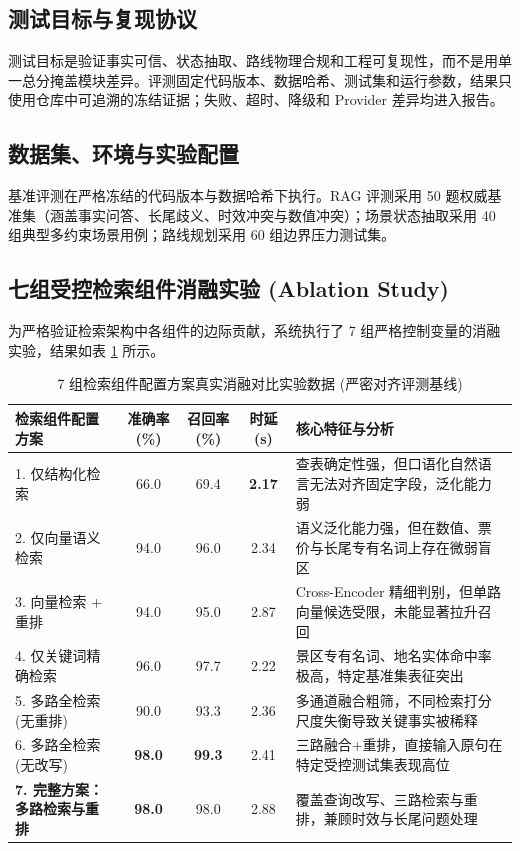 \documentclass[11pt,a4paper]{ctexart}
\begin{document}
\subsection{测试目标与复现协议}
测试目标是验证事实可信、状态抽取、路线物理合规和工程可复现性，而不是用单一总分掩盖模块差异。评测固定代码版本、数据哈希、测试集和运行参数，结果只使用仓库中可追溯的冻结证据；失败、超时、降级和 Provider 差异均进入报告。

\subsection{数据集、环境与实验配置}
基准评测在严格冻结的代码版本与数据哈希下执行。RAG 评测采用 50 题权威基准集（涵盖事实问答、长尾歧义、时效冲突与数值冲突）；场景状态抽取采用 40 组典型多约束场景用例；路线规划采用 60 组边界压力测试集。

\subsection{七组受控检索组件消融实验 (Ablation Study)}
为严格验证检索架构中各组件的边际贡献，系统执行了 7 组严格控制变量的消融实验，结果如表 \ref{tab:ablation} 所示。

\begin{table}[htbp]
\centering
\small
\caption{7 组检索组件配置方案真实消融对比实验数据 (严密对齐评测基线)}
\label{tab:ablation}
\begin{tabularx}{\textwidth}{p{4.5cm}cccX}
\toprule
\textbf{检索组件配置方案} & \textbf{准确率(\%)} & \textbf{召回率(\%)} & \textbf{时延(s)} & \textbf{核心特征与分析} \\
\midrule
1. 仅结构化检索 & 66.0 & 69.4 & \textbf{2.17} & 查表确定性强，但口语化自然语言无法对齐固定字段，泛化能力弱 \\
2. 仅向量语义检索 & 94.0 & 96.0 & 2.34 & 语义泛化能力强，但在数值、票价与长尾专有名词上存在微弱盲区 \\
3. 向量检索 + 重排 & 94.0 & 95.0 & 2.87 & Cross-Encoder 精细判别，但单路向量候选受限，未能显著拉升召回 \\
4. 仅关键词精确检索 & 96.0 & 97.7 & 2.22 & 景区专有名词、地名实体命中率极高，特定基准集表征突出 \\
5. 多路全检索 (无重排) & 90.0 & 93.3 & 2.36 & 多通道融合粗筛，不同检索打分尺度失衡导致关键事实被稀释 \\
6. 多路全检索 (无改写) & \textbf{98.0} & \textbf{99.3} & 2.41 & 三路融合+重排，直接输入原句在特定受控测试集表现高位 \\
\textbf{7. 完整方案：多路检索与重排} & \textbf{98.0} & 98.0 & 2.88 & 覆盖查询改写、三路检索与重排，兼顾时效与长尾问题处理 \\
\bottomrule
\end{tabularx}
\end{table}
\end{document}
